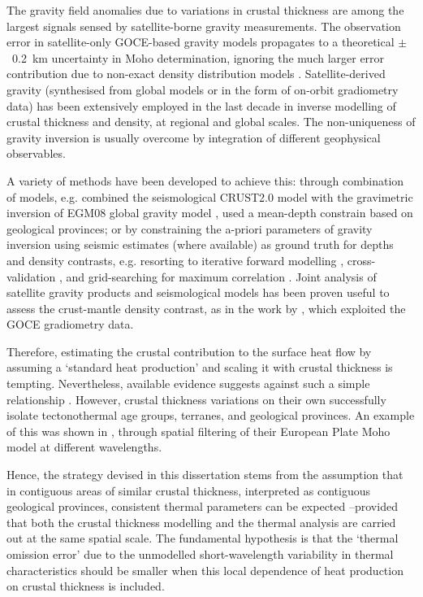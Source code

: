 The gravity field anomalies due to variations in crustal thickness are among the largest signals sensed by satellite-borne gravity measurements.
The observation error in satellite-only GOCE-based gravity models propagates to a theoretical $\pm$~\SI{0.2}{\kilo \metre} uncertainty in Moho determination, ignoring the much larger error contribution due to non-exact density distribution models \parencites{braitenberg2011goce}{MeijdePail2020}.
Satellite-derived gravity (synthesised from global models or in the form of on-orbit gradiometry data) has been extensively employed in the last decade in inverse modelling of crustal thickness and density, at regional and global scales.
The non-uniqueness of gravity inversion is usually overcome by integration of different geophysical observables.

A variety of methods have been developed to achieve this: through combination of models, e.g. \textcite{Eshagh2011} combined the seismological {CRUST2.0 model} \parencite{Bassin2000Crust20} with the gravimetric inversion of {EGM08} global gravity model \parencite{Pavlis2012EGM2008}, \textcite{Reguzzoni2015} used a mean-depth constrain based on geological provinces; or by constraining the a-priori parameters of gravity inversion using seismic estimates (where available) as ground truth for depths and density contrasts, e.g. resorting to iterative forward modelling \parencite{Ebbing2006}, cross-validation \parencite{Uieda2017}, and grid-searching for maximum correlation \parencite{Zhao2020}.
Joint analysis of satellite gravity products and seismological models has been proven useful to assess the crust-mantle density contrast, as in the work by \textcite{Eshagh2016contrast}, which exploited the GOCE gradiometry data.

Therefore, estimating the crustal contribution to the surface heat flow by assuming a `standard heat production' and scaling it with crustal thickness is tempting.
Nevertheless, available evidence suggests against such a simple relationship \parencites{Mareschal2013}{Alessio2018deepRHP}.
However, crustal thickness variations on their own successfully isolate tectonothermal age groups, terranes, and geological provinces.
An example of this was shown in \textcite{Grad2009}, through spatial filtering of their European Plate Moho model at different wavelengths.

Hence, the strategy devised in this dissertation stems from the assumption that in contiguous areas of similar crustal thickness, interpreted as contiguous geological provinces, consistent thermal parameters can be expected --provided that both the crustal thickness modelling and the thermal analysis are carried out at the same spatial scale.
The fundamental hypothesis is that the `thermal omission error' due to the unmodelled short-wavelength variability in thermal characteristics should be smaller when this local dependence of heat production on crustal thickness is included.

